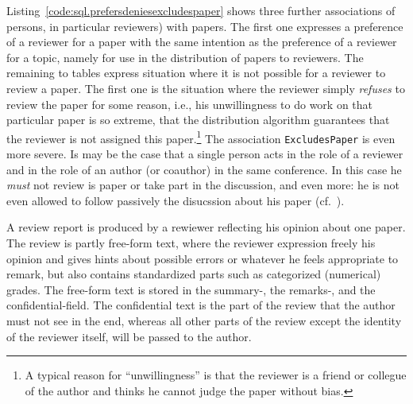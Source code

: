 Listing~\ref{code:sql.prefersdeniesexcludespaper} shows three further
associations of persons, in particular reviewers) with papers. The first one
expresses a preference of a reviewer for a paper with the same intention as
the preference of a reviewer for a topic, namely for use in the distribution
of papers to reviewers.
%
The remaining to tables express situation where it is not possible for a
reviewer to review a paper. The first one is the situation where the reviewer
simply \emph{refuses} to review the paper for some reason, i.e., his
unwillingness to do work on that particular paper is so extreme, that the
distribution algorithm guarantees that the reviewer is not assigned this
paper.\footnote{A typical reason for ``unwillingness'' is that the reviewer is
  a friend or collegue of the author and thinks he cannot judge the paper
  without bias.} The association \texttt{ExcludesPaper} is even more severe.
Is may be the case that a single person acts in the role of a reviewer and in
the role of an author (or coauthor) in the same conference. In this case he
\emph{must} not review is paper or take part in the discussion, and even more:
he is not even allowed to follow passively the disucssion about his paper
(cf.\ \cite{coma:requirements}).

%




A review report is produced by a rewiewer reflecting his opinion about one
paper. The review is partly free-form text, where the reviewer expression
freely his opinion and gives hints about possible errors or whatever he feels
appropriate to remark, but also contains standardized parts such as
categorized (numerical) grades. The free-form text is stored in the summary-,
the remarks-, and the confidential-field. The confidential text is the part of
the review that the author must not see in the end, whereas all other parts of
the review except the identity of the reviewer itself, will be passed to the
author. 


%



